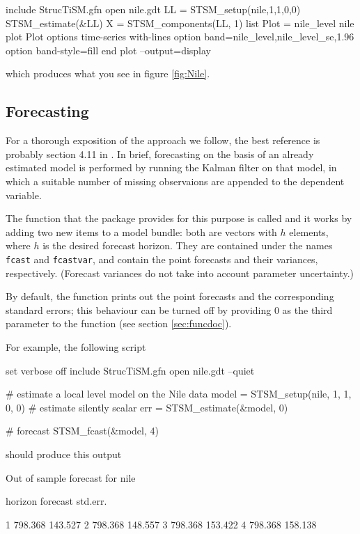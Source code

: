 \documentclass[a4paper,10pt]{article}
\begin{document}
\begin{code}
include StrucTiSM.gfn 
open nile.gdt
LL = STSM_setup(nile,1,1,0,0)
STSM_estimate(&LL)
X = STSM_components(LL, 1)
list Plot = nile_level nile
plot Plot
    options time-series with-lines
    option band=nile_level,nile_level_se,1.96 
    option band-style=fill
end plot --output=display
\end{code}

\noindent
which produces what you see in figure \ref{fig:Nile}.

\subsection{Forecasting}
\label{sec:fcast}

For a thorough exposition of the approach we follow, the best
reference is probably section 4.11 in \cite{DK2012}. In brief,
forecasting on the basis of an already estimated model is performed
by running the Kalman filter on that model, in which a suitable number
of missing observaions are appended to the dependent variable.

The function that the package provides for this purpose is called
 and it works by adding two new items to a model
bundle: both are vectors with $h$ elements, where $h$ is the desired
forecast horizon. They are contained under the names \texttt{fcast}
and \texttt{fcastvar}, and contain the point forecasts and their
variances, respectively. (Forecast variances do not take into 
account parameter uncertainty.)

By default, the function prints out the point forecasts and the
corresponding standard errors; this behaviour can be turned off by
providing 0 as the third parameter to the function (see section
\ref{sec:funcdoc}).

For example, the following script
\begin{code}
set verbose off
include StrucTiSM.gfn
open nile.gdt --quiet 

# estimate a local level model on the Nile data
model = STSM_setup(nile, 1, 1, 0, 0) 
# estimate silently
scalar err = STSM_estimate(&model, 0)

# forecast
STSM_fcast(&model, 4)
\end{code}

should produce this output
\begin{code}
Out of sample forecast for nile

   horizon    forecast    std.err.

         1     798.368     143.527
         2     798.368     148.557
         3     798.368     153.422
         4     798.368     158.138
\end{code}
\end{document}
